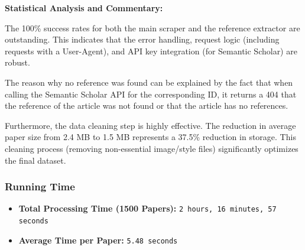 \documentclass[12pt]{article}
\begin{document}
\textbf{Statistical Analysis and Commentary:}

The 100\% success rates for both the main scraper and the reference extractor are outstanding. This indicates that the error handling, request logic (including requests with a User-Agent), and API key integration (for Semantic Scholar) are robust.

The reason why no reference was found can be explained by the fact that when calling the Semantic Scholar API for the corresponding ID, it returns a 404 that the reference of the article was not found or that the article has no references.

Furthermore, the data cleaning step is highly effective. The reduction in average paper size from 2.4 MB to 1.5 MB represents a 37.5\% reduction in storage. This cleaning process (removing non-essential image/style files) significantly optimizes the final dataset.


\subsubsection{Running Time}
\begin{itemize}
\item \textbf{Total Processing Time (1500 Papers):} \texttt{2 hours, 16 minutes, 57 seconds}
\item \textbf{Average Time per Paper:} \texttt{5.48 seconds}
\end{itemize}






\end{document}
